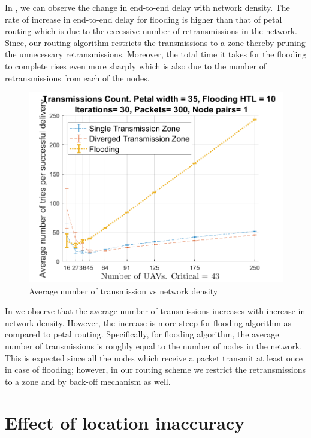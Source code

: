 In , we can observe the change in end-to-end delay with network density. The rate of increase in end-to-end delay for flooding is higher than that of petal routing which is due to the excessive number of retransmissions in the network. Since, our routing algorithm restricts the transmissions to a zone thereby pruning the unnecessary retransmissions. Moreover, the total time it takes for the flooding to complete rises even more sharply which is also due to the number of retransmissions from each of the nodes.

\begin{figure}[hbtp]
\centering
\includegraphics[width=\simResultFigSize\textwidth]{ncsuthesis-0.6/Chapter-5/figs/ND_trans}
\caption{Average number of transmission vs network density}
\label{fig:ND_trans}
\end{figure}

In  we observe that the average number of transmissions increases with increase in network density. However, the increase is more steep for flooding algorithm as compared to petal routing. Specifically, for flooding algorithm, the average number of transmissions is roughly equal to the number of nodes in the network. This is expected since all the nodes which receive a packet transmit at least once in case of flooding; however, in our routing scheme we restrict the retransmissions to a zone and by back-off mechanism as well.

\section{Effect of location inaccuracy}


